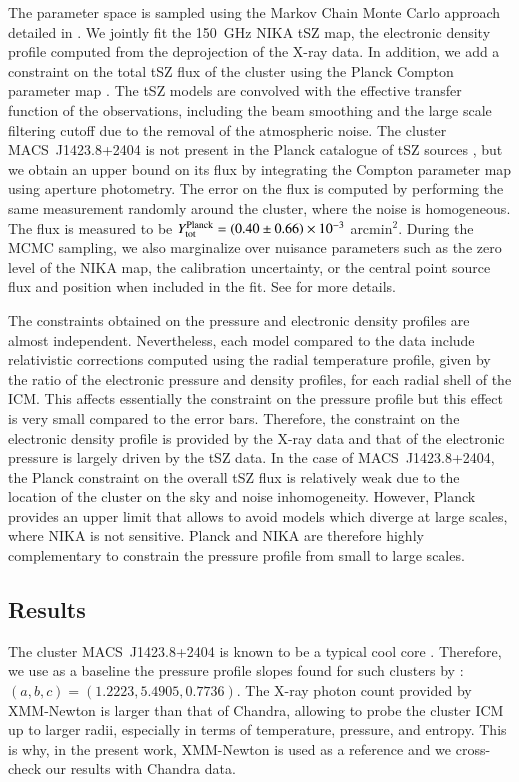 \documentclass[twocolumn,traditabstract]{aa}
\begin{document}
The parameter space is sampled using the Markov Chain Monte Carlo approach detailed in \cite{adam2014}. We jointly fit the 150~GHz NIKA tSZ map, the electronic density profile computed from the deprojection of the X-ray data. In addition, we add a constraint on the total tSZ flux of the cluster using the Planck Compton parameter map \citep{planck2015XXII}. The tSZ models are convolved with the effective transfer function of the observations, including the beam smoothing and the large scale filtering cutoff due to the removal of the atmospheric noise. The cluster \mbox{MACS~J1423.8+2404} is not present in the Planck catalogue of tSZ sources \citep{planck2015XXVII}, but we obtain an upper bound on its flux by integrating the Compton parameter map \citep{planck2015XXII} using aperture photometry. The error on the flux is computed by performing the same measurement randomly around the cluster, where the noise is homogeneous. The flux is measured to be $Y_{\rm tot}^{\rm Planck} = \left(0.40 \pm 0.66\right) \times 10^{-3}$ arcmin$^2$. During the MCMC sampling, we also marginalize over nuisance parameters such as the zero level of the NIKA map, the calibration uncertainty, or the central point source flux and position when included in the fit. See \cite{adam2014} for more details.

The constraints obtained on the pressure and electronic density profiles are almost independent. Nevertheless, each model compared to the data include relativistic corrections computed using the radial temperature profile, given by the ratio of the electronic pressure and density profiles, for each radial shell of the ICM. This affects essentially the constraint on the pressure profile but this effect is very small compared to the error bars. Therefore, the constraint on the electronic density profile is provided by the X-ray data and that of the electronic pressure is largely driven by the tSZ data. In the case of \mbox{MACS~J1423.8+2404}, the Planck constraint on the overall tSZ flux is relatively weak due to the location of the cluster on the sky and noise inhomogeneity. However, Planck provides an upper limit that allows to avoid models which diverge at large scales, where NIKA is not sensitive. Planck and NIKA are therefore highly complementary to constrain the pressure profile from small to large scales.

\subsection{Results}\label{sec:results}
The cluster \mbox{MACS~J1423.8+2404} is known to be a typical cool core \citep[e.g.][]{morandi2010}. Therefore, we use as a baseline the pressure profile slopes found for such clusters by \cite{arnaud2010}: $\left(a,b,c\right) = \left(1.2223, 5.4905, 0.7736\right)$. The X-ray photon count provided by XMM-Newton is larger than that of Chandra, allowing to probe the cluster ICM up to larger radii, especially in terms of temperature, pressure, and entropy. This is why, in the present work, XMM-Newton is used as a reference and we cross-check our results with Chandra data.
\end{document}
